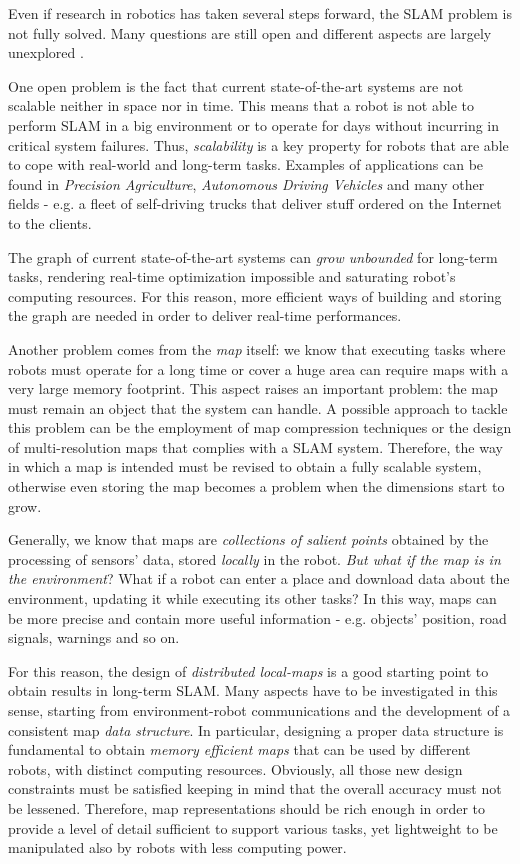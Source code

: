 \documentclass[10pt,a4paper, notitlepage]{report}
\begin{document}
Even if research in robotics has taken several steps forward, the SLAM problem is not fully solved. Many questions are still open and different aspects are largely unexplored \cite{carlone2016slam-survey}. 

One open problem is the fact that current state-of-the-art systems are not scalable neither in space nor in time. This means that a robot is not able to perform SLAM in a big environment or to operate for days without incurring in critical system failures. Thus, \textit{scalability} is a key property for robots that are able to cope with real-world and long-term tasks. Examples of applications can be found in \textit{Precision Agriculture}, \textit{Autonomous Driving Vehicles} and many other fields - e.g. a fleet of self-driving trucks that deliver stuff ordered on the Internet to the clients. 

The graph of current state-of-the-art systems can \textit{grow unbounded} for long-term tasks, rendering real-time optimization impossible and saturating robot's computing resources. For this reason, more efficient ways of building and storing the graph are needed in order to deliver real-time performances.

Another problem comes from the \textit{map} itself: we know that executing tasks where robots must operate for a long time or cover a huge area can require maps with a very large memory footprint. This aspect raises an important problem: the map must remain an object that the system can handle. A possible approach to tackle this problem can be the employment of map compression techniques or the design of multi-resolution maps that complies with a SLAM system. Therefore, the way in which a map is intended must be revised to obtain a fully scalable system, otherwise even storing the map becomes a problem when the dimensions start to grow. 

Generally, we know that maps are \textit{collections of salient points} obtained by the processing of sensors' data, stored \textit{locally} in the robot. \textit{But what if the map is in the environment}? What if a robot can enter a place and download data about the environment, updating it while executing its other tasks? In this way, maps can be more precise and contain more useful information - e.g. objects' position, road signals, warnings and so on. 

For this reason, the design of \textit{distributed local-maps} is a good starting point to obtain results in long-term SLAM. Many aspects have to be investigated in this sense, starting from environment-robot communications and the development of a consistent map \textit{data structure}. In particular, designing a proper data structure is fundamental to obtain \textit{memory efficient maps} that can be used by different robots, with distinct computing resources. Obviously, all those new design constraints must be satisfied keeping in mind that the overall accuracy must not be lessened. Therefore, map representations should be rich enough in order to provide a level of detail sufficient to support various tasks, yet lightweight to be manipulated also by robots with less computing power.
\end{document}
